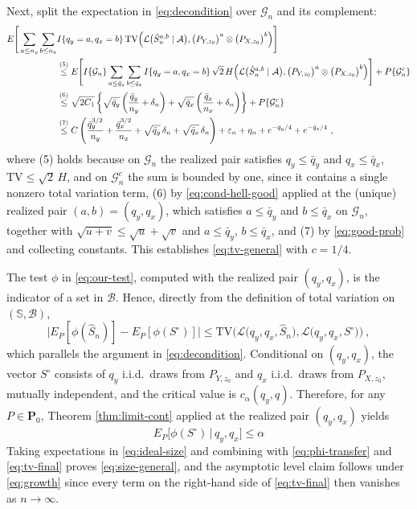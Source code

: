 \documentclass[11pt]{article}
\numberwithin{equation}{section}
\begin{document}
Next, split the expectation in \eqref{eq:decondition} over $\mathcal{G}_n$ and its complement:
\begin{align}
 E\Bigg[\sum_{a\le n_y}\sum_{b\le n_x}&I\{q_y=a,q_x=b\}\,
 \mathrm{TV}\Big(\mathcal L\big(\hat S_n^{a,b}\mid\mathcal A\big),
 \big(P_{Y,z_0}\big)^{a}\otimes\big(P_{X,z_0}\big)^{b}\Big)\Bigg]\notag\\
 &\overset{(5)}{\le}
 E\Bigg[I\{\mathcal{G}_n\}\sum_{a\le \bar q_y}\sum_{b\le \bar q_x}I\{q_y=a,q_x=b\}\,
 \sqrt{2}\,H\Big(\mathcal L\big(\hat S_n^{a,b}\mid\mathcal A\big),
 \big(P_{Y,z_0}\big)^{a}\otimes\big(P_{X,z_0}\big)^{b}\Big)\Bigg]
 +P\{\mathcal{G}_n^c\}\notag\\
 &\overset{(6)}{\le}
 \sqrt{2C_1}\left\{\sqrt{\bar q_y}\left(\frac{\bar q_y}{n_y}+\delta_n\right)
 +\sqrt{\bar q_x}\left(\frac{\bar q_x}{n_x}+\delta_n\right)\right\}
 +P\{\mathcal{G}_n^c\}\notag\\
 &\overset{(7)}{\le}
 C\left(\frac{\bar q_y^{3/2}}{n_y}+\frac{\bar q_x^{3/2}}{n_x}
 +\sqrt{\bar q_y}\,\delta_n+\sqrt{\bar q_x}\,\delta_n\right)
 +\varepsilon_n+\eta_n+e^{-\bar q_y/4}+e^{-\bar q_x/4}~,
 \label{eq:tv-final}
\end{align}
where (5) holds because on $\mathcal{G}_n$ the realized pair satisfies $q_y\le\bar q_y$ and
$q_x\le\bar q_x$, $\mathrm{TV}\le\sqrt{2}\,H$, and on $\mathcal{G}_n^c$ the sum is bounded by one, since it contains a single nonzero total variation term, (6) by \eqref{eq:cond-hell-good} applied at the (unique) realized pair $(a,b)=(q_y,q_x)$, which satisfies $a\le\bar q_y$ and $b\le\bar q_x$ on $\mathcal{G}_n$, together with $\sqrt{u+v}\le\sqrt{u}+\sqrt{v}$ and $a\le\bar q_y$, $b\le\bar q_x$, and (7) by \eqref{eq:good-prob} and collecting constants. This establishes \eqref{eq:tv-general} with $c=1/4$.

\medskip
{} The test $\phi$ in \eqref{eq:our-test}, computed
with the realized pair $(q_y,q_x)$, is the indicator of a set in $\mathcal B$. Hence, directly from
the definition of total variation on $(\mathbb S,\mathcal B)$,
\begin{equation}\label{eq:phi-transfer}
 \Big\vert E_P[\phi(\hat S_n)]-E_P[\phi(S^{\circ})] \Big\vert
 \le \mathrm{TV}\Big( \mathcal L\big(q_y,q_x,\hat S_n\big),\mathcal L\big(q_y,q_x,S^{\circ}\big) \Big)~,
\end{equation}
which parallels the argument in \eqref{eq:decondition}. Conditional on $(q_y,q_x)$, the vector
$S^{\circ}$ consists of $q_y$ i.i.d.\ draws from $P_{Y,z_0}$ and $q_x$ i.i.d.\ draws from
$P_{X,z_0}$, mutually independent, and the critical value is $c_\alpha(q_y,q)$. Therefore, for
any $P\in\mathbf P_0$, Theorem \ref{thm:limit-cont} applied at the realized pair $(q_y,q_x)$ yields
\begin{equation}\label{eq:ideal-size}
 E_P\big[\phi(S^{\circ})\,\big|\,q_y,q_x\big]\le\alpha
\end{equation}
Taking expectations in \eqref{eq:ideal-size} and combining with \eqref{eq:phi-transfer} and \eqref{eq:tv-final} proves \eqref{eq:size-general}, and the asymptotic level claim follows under \eqref{eq:growth} since every term on the right-hand side of \eqref{eq:tv-final} then vanishes as $n\to \infty$.
\end{document}
